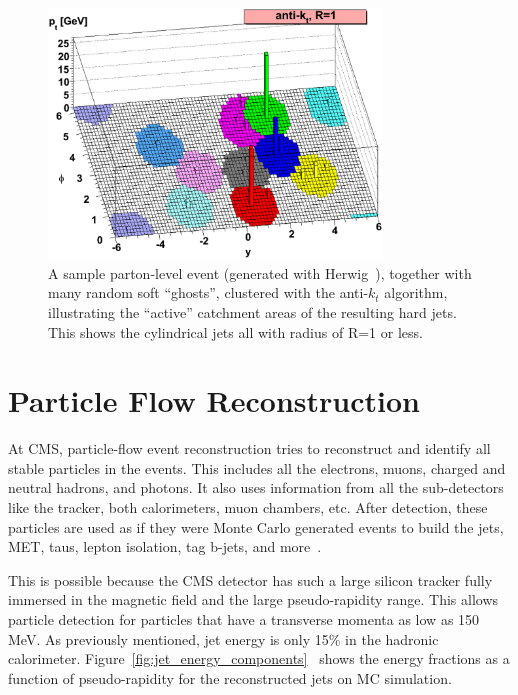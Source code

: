 \begin{figure}

\includegraphics[width=0.79\textwidth]{Reconstruction/herwig-parton-level-ev-antikt-R1-ghosted4root.eps}
\centering
\caption{A sample parton-level event (generated with
    Herwig~\cite{Herwig}), together with many random soft ``ghosts'',
    clustered with the anti-$k_t$ algorithm, illustrating the
    ``active'' catchment areas of the resulting hard jets. This shows the cylindrical jets all with radius of R=1 or less.~\cite{1126-6708-2008-04-063}}
\label{fig:anti_atk}
\end{figure}

\section{Particle Flow Reconstruction}

At CMS, particle-flow event reconstruction tries to reconstruct and identify all stable particles in the events.  This includes all the electrons, muons, charged and neutral hadrons, and photons.  It also uses information from all the sub-detectors like the tracker, both calorimeters, muon chambers, etc. After detection, these particles are used as if they were Monte Carlo generated events to build the jets, MET, taus, lepton isolation, tag b-jets, and more~\cite{particleflow}.

This is possible because the CMS detector has such a large silicon tracker fully immersed in the magnetic field and the large pseudo-rapidity range. This allows particle detection for particles that have a transverse momenta as low as 150 MeV.  As previously mentioned, jet energy is only 15\% in the hadronic calorimeter. Figure~\ref{fig:jet_energy_components}~\cite{Pandolfi_thesis} shows the energy fractions as a function of pseudo-rapidity for the reconstructed jets on MC simulation.  


